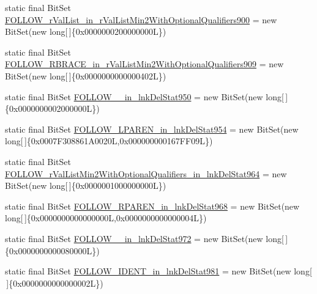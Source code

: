 \begin{DoxyCompactItemize}
\item 
static final Bit\-Set \hyperlink{classorg_1_1tzi_1_1use_1_1parser_1_1soil_1_1_soil_parser_ab5768ea85cb0832424df18ed0766539e}{F\-O\-L\-L\-O\-W\-\_\-r\-Val\-List\-\_\-in\-\_\-r\-Val\-List\-Min2\-With\-Optional\-Qualifiers900} = new Bit\-Set(new long\mbox{[}$\,$\mbox{]}\{0x0000000200000000\-L\})
\item 
static final Bit\-Set \hyperlink{classorg_1_1tzi_1_1use_1_1parser_1_1soil_1_1_soil_parser_aa8e41e1704399b90ed84819057c01706}{F\-O\-L\-L\-O\-W\-\_\-\-R\-B\-R\-A\-C\-E\-\_\-in\-\_\-r\-Val\-List\-Min2\-With\-Optional\-Qualifiers909} = new Bit\-Set(new long\mbox{[}$\,$\mbox{]}\{0x0000000000000402\-L\})
\item 
static final Bit\-Set \hyperlink{classorg_1_1tzi_1_1use_1_1parser_1_1soil_1_1_soil_parser_a6ac396299e3127c8deacd2fc690673c1}{F\-O\-L\-L\-O\-W\-\_\-\_\-in\-\_\-lnk\-Del\-Stat950} = new Bit\-Set(new long\mbox{[}$\,$\mbox{]}\{0x0000000002000000\-L\})
\item 
static final Bit\-Set \hyperlink{classorg_1_1tzi_1_1use_1_1parser_1_1soil_1_1_soil_parser_a7bff8ed2a7e02156df968192c3565a5b}{F\-O\-L\-L\-O\-W\-\_\-\-L\-P\-A\-R\-E\-N\-\_\-in\-\_\-lnk\-Del\-Stat954} = new Bit\-Set(new long\mbox{[}$\,$\mbox{]}\{0x0007\-F308861\-A0020\-L,0x000000000167\-F\-F09\-L\})
\item 
static final Bit\-Set \hyperlink{classorg_1_1tzi_1_1use_1_1parser_1_1soil_1_1_soil_parser_ae4506dcd63b9382aaf0ea4422c9b8fbe}{F\-O\-L\-L\-O\-W\-\_\-r\-Val\-List\-Min2\-With\-Optional\-Qualifiers\-\_\-in\-\_\-lnk\-Del\-Stat964} = new Bit\-Set(new long\mbox{[}$\,$\mbox{]}\{0x0000001000000000\-L\})
\item 
static final Bit\-Set \hyperlink{classorg_1_1tzi_1_1use_1_1parser_1_1soil_1_1_soil_parser_a618e85264ba4f71fe66916833c1fb5de}{F\-O\-L\-L\-O\-W\-\_\-\-R\-P\-A\-R\-E\-N\-\_\-in\-\_\-lnk\-Del\-Stat968} = new Bit\-Set(new long\mbox{[}$\,$\mbox{]}\{0x0000000000000000\-L,0x0000000000000004\-L\})
\item 
static final Bit\-Set \hyperlink{classorg_1_1tzi_1_1use_1_1parser_1_1soil_1_1_soil_parser_aa64d50d416bbc54c954a4d728631e649}{F\-O\-L\-L\-O\-W\-\_\-\_\-in\-\_\-lnk\-Del\-Stat972} = new Bit\-Set(new long\mbox{[}$\,$\mbox{]}\{0x0000000000080000\-L\})
\item 
static final Bit\-Set \hyperlink{classorg_1_1tzi_1_1use_1_1parser_1_1soil_1_1_soil_parser_a4ca136272e62e9b9529c82e2c3102a07}{F\-O\-L\-L\-O\-W\-\_\-\-I\-D\-E\-N\-T\-\_\-in\-\_\-lnk\-Del\-Stat981} = new Bit\-Set(new long\mbox{[}$\,$\mbox{]}\{0x0000000000000002\-L\})

\end{DoxyCompactItemize}
